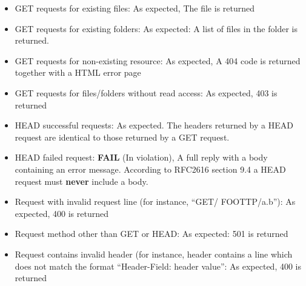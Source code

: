 \documentclass{sig-alternate}
\begin{document}
\begin{itemize}
\item GET requests for existing files: As expected, The file is
  returned
\item GET requests for existing folders: As expected: A list of files
  in the folder is returned.
\item GET requests for non-existing resource: As expected, A 404 code is
returned together with a HTML error page
\item GET requests for files/folders without read access: As expected, 403
is returned

\item HEAD successful requests: As expected. The headers returned by a HEAD
request are identical to those returned by a GET request.
\item HEAD failed request: \textbf{FAIL} (In violation), A full reply with a body
  containing an error message. According to RFC2616 section 9.4 a HEAD
  request must \textbf{never} include a body.

\item Request with invalid request line (for instance, ``GET/ FOOTTP/a.b''): As expected, 400 is returned
\item Request method other than GET or HEAD: As expected: 501 is returned
\item Request contains invalid header (for instance, header contains a
  line which does not match the format ``Header-Field: header value'': As expected, 400 is returned
\end{itemize}

%
%


%


\end{document}
